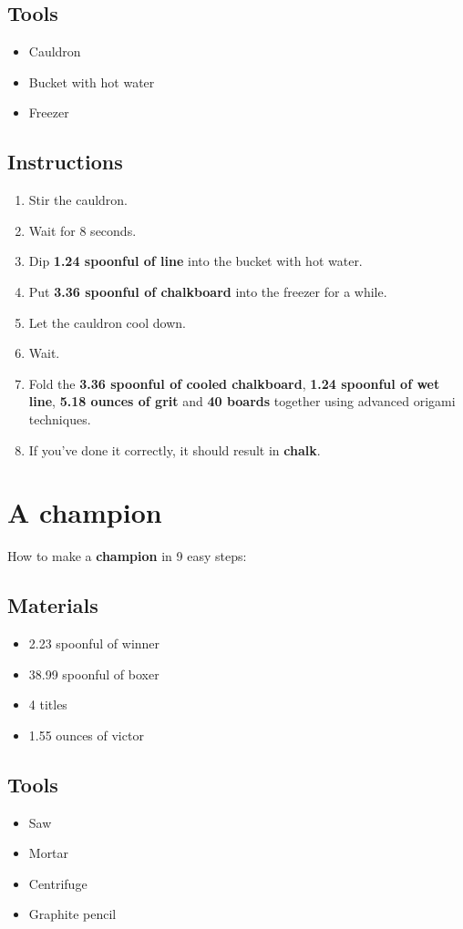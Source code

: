 \documentclass{article}
\begin{document}
\subsection{Tools}\begin{itemize}
\item 
Cauldron
\item 
Bucket with hot water
\item 
Freezer
\end{itemize}
\subsection{Instructions}\begin{enumerate}
\item 
Stir the cauldron.
\item 
Wait for 8 seconds.
\item 
Dip \textbf{1.24 spoonful of line} into the bucket with hot water.
\item 
Put \textbf{3.36 spoonful of chalkboard} into the freezer for a while.
\item 
Let the cauldron cool down.
\item 
Wait.
\item 
Fold the \textbf{3.36 spoonful of cooled chalkboard}, \textbf{1.24 spoonful of wet line}, \textbf{5.18 ounces of grit} and \textbf{40 boards} together using advanced origami techniques.
\item 
If you've done it correctly, it should result in \textbf{chalk}.
\end{enumerate}
\newpage
\section{A champion}How to make a \textbf{champion} in 9 easy steps:

\subsection{Materials}\begin{itemize}
\item 
2.23 spoonful of winner
\item 
38.99 spoonful of boxer
\item 
4 titles
\item 
1.55 ounces of victor
\end{itemize}
\subsection{Tools}\begin{itemize}
\item 
Saw
\item 
Mortar
\item 
Centrifuge
\item 
Graphite pencil
\end{itemize}
\end{document}
